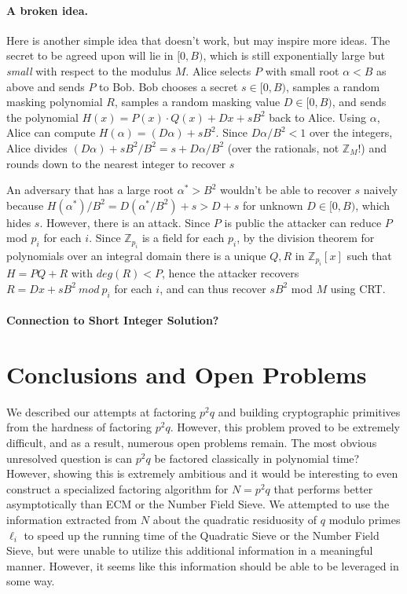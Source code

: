 \documentclass[letterpaper,twocolumn,10pt]{article}
\begin{document}
\paragraph{A broken idea.} Here is another simple idea that doesn't work, but may inspire more ideas. The secret to be agreed upon will lie in $[0, B)$, which is still exponentially large but \emph{small} with respect to the modulus $M$. Alice selects $P$ with small root $\alpha < B$ as above and sends $P$ to Bob. Bob chooses a secret $s \in [0, B)$, samples a random masking polynomial $R$, samples a random masking value $D \in [0, B)$, and sends the polynomial $H(x) = P(x) \cdot Q(x) + D x + sB^2$ back to Alice. Using $\alpha$, Alice can compute $H(\alpha) = (D \alpha) + sB^2$. Since $D\alpha/B^2 < 1$ over the integers, Alice divides $(D \alpha) + sB^2 / B^2 = s + D\alpha/B^2$ (over the rationals, not $\mathbb{Z}_M$!) and rounds down to the nearest integer to recover $s$

An adversary that has a large root $\alpha^* > B^2$ wouldn't be able to recover $s$ naively because $H(\alpha^*)/B^2 = D (\alpha^*/ B^2) + s > D + s$ for unknown $D \in [0, B)$, which hides $s$. However, there is an attack. Since $P$ is public the attacker can reduce $P$ mod $p_i$ for each $i$. Since $\mathbb{Z}_{p_i}$ is a field for each $p_i$, by the division theorem for polynomials over an integral domain there is a unique $Q, R$ in $\mathbb{Z}_{p_i}[x]$ such that $H = P Q + R$ with $deg(R) < P$, hence the attacker recovers $R = D x + sB^2 \ mod \ p_i$ for each $i$, and can thus recover $s B^2$ mod $M$ using CRT. 
 
\paragraph{Connection to Short Integer Solution?} 

\section{Conclusions and Open Problems}

We described our attempts at factoring $p^2 q$ and building cryptographic primitives from the hardness of factoring $p^2 q$. However, this problem proved to be extremely difficult, and as a result, numerous open problems remain. The most obvious unresolved question is can $p^2 q$ be factored classically in polynomial time? However, showing this is extremely ambitious and it would be interesting to even construct a specialized factoring algorithm for $N = p^2 q$ that performs better asymptotically than ECM or the Number Field Sieve. We attempted to use the information extracted from $N$ about the quadratic residuosity of $q$ modulo primes $\ell_i$ to speed up the running time of the Quadratic Sieve or the Number Field Sieve, but were unable to utilize this additional information in a meaningful manner. However, it seems like this information should be able to be leveraged in some way.
\end{document}
